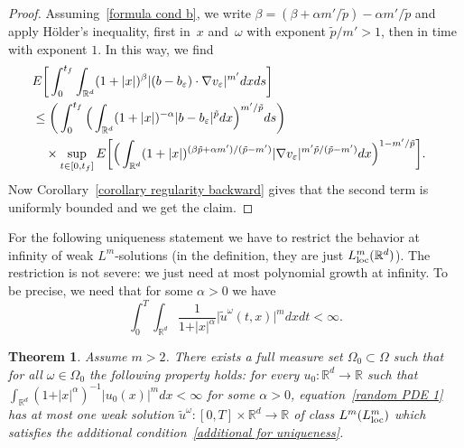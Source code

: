 \documentclass[a4paper,10pt]{article}
\newtheorem{theorem}{Theorem}[section]
\newcommand\1{\mathbbm{1}}
\newcommand{\mr}{\mathbb{R}}
\newcommand{\td}{\tilde}
\newcommand{\eps}{\varepsilon}
\newcommand\loc{{\rm loc}}
\numberwithin{equation}{section}
\begin{document}
\begin{proof}
Assuming~\eqref{formula cond b}, we write $\beta=(\beta+\alpha m'/\td{p})-\alpha m'/\td{p}$ and apply H\"older's inequality, first in~$x$ and~$\omega$ with exponent $\td{p}/m'>1$, then in time with exponent $1$. In this way, we find
\begin{align*}
\lefteqn{E \bigg[ \int^{t_f}_0\int_{\mr^d}(1+|x|)^\beta|(b-b_\eps)\cdot\nabla v_\eps|^{m'}dxds \bigg] } \\
& \le \bigg(\int^{t_f}_0\Big(\int_{\mr^d}(1+|x|)^{-\alpha}|b-b_\eps|^{\td{p}}dx\Big)^{m'/\td{p}}ds \bigg)\\
& \quad {}\times \sup_{t\in[0,t_f]} E\bigg[ \Big(\int_{\mr^d}(1+|x|)^{(\beta\td{p}+\alpha m')/(\td{p}-m')} |\nabla v_\eps|^{m'\td{p}/(\td{p}-m')} dx \Big)^{1-m'/\td{p}} \bigg] .
\end{align*}
Now Corollary~\ref{corollary regularity backward} gives that the second term is uniformly bounded and we get the claim.
\end{proof}

For the following uniqueness statement we have to restrict the behavior at
infinity of weak $L^{m}$-solutions (in the definition, they are just
$L_{\loc}^{m}(  \mathbb{R}^{d})  $). The restriction is not severe:
we just need at most polynomial growth at infinity. To be precise, we need
that for some $\alpha>0$ we have
\begin{equation}
\int_{0}^{T}\int_{\mathbb{R}^{d}}\frac{1}{1+ \vert x \vert^{\alpha}} \vert \widetilde{u}^\omega(t,x) \vert^{m}dx dt<\infty .\label{additional for uniqueness}
\end{equation}

\begin{theorem}\label{pathbypath uniq SPDE}
Assume $m>2$. There exists a full measure set $\Omega
_{0}\subset\Omega$ such that for all $\omega\in\Omega_{0}$ the following
property holds: for every $u_{0} \colon \mathbb{R}^{d}\rightarrow\mathbb{R}$ such
that $\int_{\mathbb{R}^{d}} (1+ \vert x \vert^{\alpha})^{-1} \vert u_{0}(x) \vert^{m}dx<\infty$ for some
$\alpha>0$, equation~\eqref{random PDE 1} has at most one weak solution $\widetilde{u}^\omega \colon [0,T] \times \mathbb{R}^{d}\rightarrow\mathbb{R}$ of class $L^{m}(L^{m}_\loc)$ which satisfies the additional condition~\eqref{additional for uniqueness}.
\end{theorem}
\end{document}
